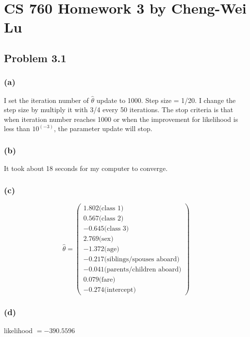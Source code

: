 \documentclass{article}
\begin{document}
\section*{CS 760 Homework 3 by Cheng-Wei Lu}

\subsection*{Problem 3.1}
\subsubsection*{(a)}
	I set the iteration number of $\hat{\theta}$ update to 1000. Step size = 1/20. I change the step size by multiply it with 3/4 every 50 iterations. The stop criteria is that when iteration number reaches 1000 or when the improvement for likelihood is less than $10^(-3)$, the parameter update will stop.

\subsubsection*{(b)}
	It took about 18 seconds for my computer to converge.
\subsubsection*{(c)}
	\begin{equation*}
		\hat{\theta} =  \begin{pmatrix} 1.802\text{(class 1)}\\ 0.567 \text{(class 2)}\\ -0.645 \text{(class 3)}\\ 2.769 \text{(sex)}\\ -1.372\text{(age)}\\ -0.217\text{(siblings/spouses aboard)}\\-0.041\text{(parents/children aboard)}\\ 0.079\text{(fare)}\\-0.274\text{(intercept)} \end{pmatrix} 	\end{equation*}
	
\subsubsection*{(d)}
	likelihood $ = -390.5596 $
	
\end{document}

